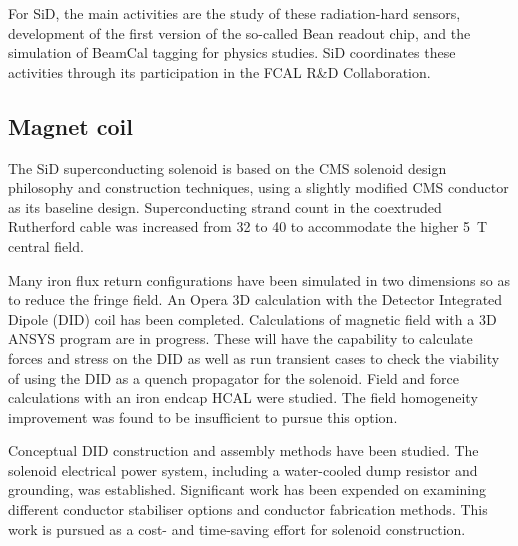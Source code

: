 For SiD, the main activities are the study of these radiation-hard sensors, development of the first version of the so-called Bean readout chip, and the simulation of BeamCal tagging for physics studies. SiD coordinates these activities through its participation in the FCAL R\&D Collaboration.

\subsection{Magnet coil}

The SiD superconducting solenoid is based on the CMS solenoid
design philosophy and construction techniques, using a slightly modified CMS
conductor as its baseline design. Superconducting strand count in the coextruded
Rutherford cable was increased from 32 to 40 to accommodate the higher 5~T
central field. 

Many iron flux return configurations have been simulated in two
dimensions so as to reduce the fringe field. An Opera 3D calculation with the Detector
Integrated Dipole (DID) coil has been completed.
Calculations of magnetic field with a 3D ANSYS program
are in progress. These will have the capability to calculate forces and stress
on the DID as well as run transient cases to check the viability of using the
DID as a quench propagator for the solenoid. Field and force calculations with
an iron endcap HCAL were studied. The field homogeneity improvement was found
to be insufficient to pursue this option. 

Conceptual DID construction and
assembly methods have been studied. The solenoid electrical power system,
including a water-cooled dump resistor and grounding, was established.
Significant work has been expended on examining different conductor stabiliser
options and conductor fabrication methods. This work is pursued as a cost- and
time-saving effort for solenoid construction.

